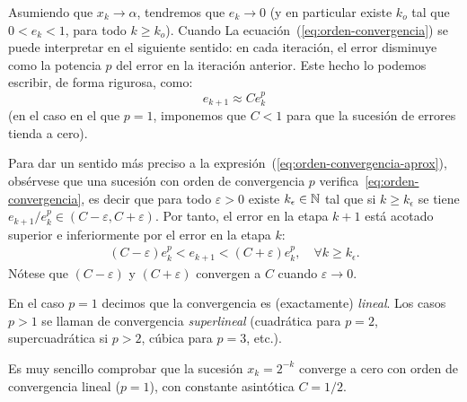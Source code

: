 \begin{remark}
  Asumiendo que $x_k \to \alpha$, tendremos que $e_k \to 0$ (y en
  particular existe $k_o$ tal que $0<e_k<1$, para todo $k\ge
  k_o$).
  Cuando La ecuación~(\ref{eq:orden-convergencia}) se puede
  interpretar en el siguiente sentido: en cada iteración, el error
  disminuye como la potencia $p$ del error en la iteración anterior.
  Este hecho lo podemos escribir, de forma rigurosa, como:
  \begin{equation}
    \label{eq:orden-convergencia-aprox}
    e_{k+1} \approx C e_k^p
  \end{equation}
  (en el caso en el que $p=1$, imponemos que $C<1$ para que la
  sucesión de errores tienda a cero).

  Para dar un sentido más preciso a la
  expresión~(\ref{eq:orden-convergencia-aprox}), obsérvese que una
  sucesión con orden de convergencia $p$
  verifica~\eqref{eq:orden-convergencia}, es decir que para todo
  $\varepsilon>0$ existe $k_\epsilon\in\operatorname{{\mathbb N}}$ tal que si
  $k\ge k_\epsilon$ se tiene
  ${e_{k+1}}/{e_k^p} \in (C-\varepsilon,C+\varepsilon)$.  Por tanto, el
  error en la etapa $k+1$ está acotado superior e inferiormente por el
  error en la etapa $k$:
  \begin{align*}
    (C-\varepsilon) e_k^p < e_{k+1} <
    (C+\varepsilon)  e_k^p, \quad \forall k \ge k_\epsilon.
  \end{align*}
  Nótese que $(C-\varepsilon)$ y $(C+\varepsilon)$ convergen a $C$
  cuando $\varepsilon\to 0$.
\end{remark}

En el caso $p=1$ decimos que la convergencia es (exactamente)
\textit{lineal}. Los casos $p>1$ se llaman de convergencia
\textit{superlineal} (cuadrática para $p=2$, supercuadrática si $p>2$,
cúbica para $p=3$, etc.).

\begin{example}
  \label{rk:2}
  Es muy sencillo comprobar que la sucesión $x_k=2^{-k}$ converge a cero
  con orden de convergencia lineal ($p=1$), con constante asintótica $C=1/2$.
\end{example}



